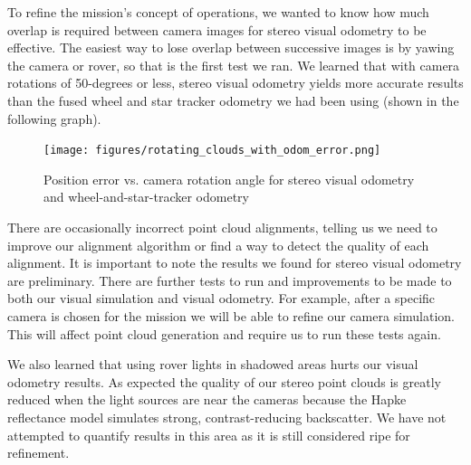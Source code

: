 \documentclass[twocolumn,letterpaper]{IEEEAerospaceCLS}  %
\begin{document}
To refine the mission's concept of operations, we wanted to know how much overlap is required between camera images for stereo visual odometry to be effective. 
The easiest way to lose overlap between successive images is by yawing the camera or rover, so that is the first test we ran. 
We learned that with camera rotations of 50-degrees or less, stereo visual odometry yields more accurate results than the fused wheel and star tracker odometry we had been using (shown in the following graph).
\begin{figure}[h!]
	\texttt{[image: figures/rotating\_clouds\_with\_odom\_error.png]}
    \caption{Position error vs. camera rotation angle for stereo visual odometry and wheel-and-star-tracker odometry}
\end{figure}

There are occasionally incorrect point cloud alignments, telling us we need to improve our alignment algorithm or find a way to detect the quality of each alignment.
It is important to note the results we found for stereo visual odometry are preliminary. 
There are further tests to run and improvements to be made to both our visual simulation and visual odometry. 
For example, after a specific camera is chosen for the mission we will be able to refine our camera simulation. 
This will affect point cloud generation and require us to run these tests again.

We also learned that using rover lights in shadowed areas hurts our visual odometry results. 
As expected the quality of our stereo point clouds is greatly reduced when the light sources are near the cameras because the Hapke reflectance model simulates strong, contrast-reducing backscatter. 
We have not attempted to quantify results in this area as it is still considered ripe for refinement.
\end{document}
